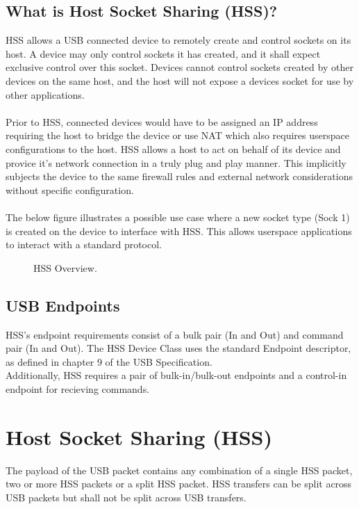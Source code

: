 \documentclass[10pt]{article}
\begin{document}
	\subsection{What is Host Socket Sharing (HSS)?}
	HSS allows a USB connected device to remotely create and control sockets on its host. A device may only control sockets it has created, and it shall expect exclusive control over this socket. Devices cannot control sockets created by other devices on the same host, and the host will not expose a devices socket for use by other applications.\\
	\\
	Prior to HSS, connected devices would have to be assigned an IP address requiring the host to bridge the device or use NAT which also requires userspace configurations to the host. HSS allows a host to act on behalf of its device and provice it's network connection in a truly plug and play manner. This implicitly subjects the device to the same firewall rules and external network considerations without specific configuration.\\
	\\
	The below figure illustrates a possible use case where a new socket type (Sock 1) is created on the device to interface with HSS. This allows userspace applications to interact with a standard protocol. 
	\begin{figure}[H]
		\begin{center}
			\caption[HSS Overview]{HSS Overview.}
			\scalebox{0.9}{}
		\end{center}
	\end{figure}

	\subsection{USB Endpoints}
	HSS's endpoint requirements consist of a bulk pair (In and Out) and command pair (In and Out). 
	The HSS Device Class uses the standard Endpoint descriptor, as defined in chapter 9 of the USB
	Specification. \\
	Additionally, HSS requires a pair of bulk-in/bulk-out endpoints and a control-in endpoint for recieving commands.
	\section{Host Socket Sharing (HSS)}
	The payload of the USB packet contains any combination of a single HSS packet, 
	two or more HSS packets or a split HSS packet. HSS transfers can be split across USB packets but shall not be split across USB transfers. 
\end{document}
